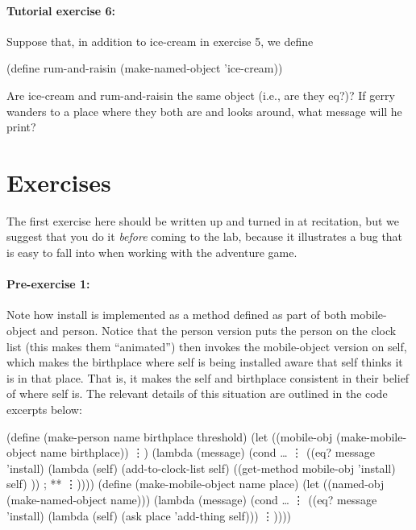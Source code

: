 \paragraph{Tutorial exercise 6:} Suppose that, in addition to {\cf
ice-cream} in exercise  5, we define

\beginlisp
(define rum-and-raisin (make-named-object 'ice-cream))
\endlisp

\noindent

Are {\cf ice-cream} and {\cf rum-and-raisin} the same object
(i.e., are they {\cf eq?})?  If {\cf gerry} wanders to a place where
they both are and looks around, what message will he print?


\section{Exercises}

The first exercise here should be written up and turned in at
recitation, but we suggest that you do it {\em before} coming to the
lab, because it illustrates a bug that is easy to fall into when
working with the adventure game.

\paragraph{Pre-exercise 1:}

Note how {\cf install} is implemented as a method defined as part of
both {\cf mobile-object} and {\cf person}. Notice that the {\cf
person} version puts the person on the clock list (this makes them
``animated'') then invokes the {\cf mobile-object} version on {\cf
self}, which makes the {\cf birthplace} where {\cf self} is being
installed aware that {\cf self} thinks it is in that place. That is,
it makes the {\cf self} and {\cf birthplace} consistent in their
belief of where {\cf self} is. The relevant details of this situation
are outlined in the code excerpts below:

\beginlisp
(define (make-person name birthplace threshold)
  (let ((mobile-obj (make-mobile-object name birthplace))
        \vdots)
    (lambda (message)
      (cond \ldots
            \vdots
            ((eq? message 'install)
             (lambda (self)
               (add-to-clock-list self)
               ((get-method mobile-obj 'install) self) ))   ; **
            \vdots))))
\null
(define (make-mobile-object name place)
  (let ((named-obj (make-named-object name)))
    (lambda (message)
      (cond \ldots
            \vdots
            ((eq? message 'install)
             (lambda (self)
               (ask place 'add-thing self)))
            \vdots))))
\endlisp

